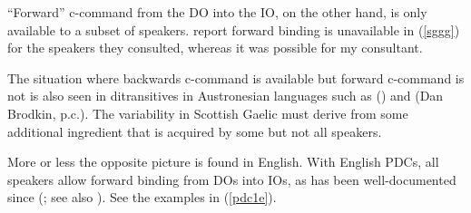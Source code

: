 \documentclass[output=paper,colorlinks,citecolor=brown]{langscibook}
\begin{document}


\noindent ``Forward'' c-command from the DO into the IO, on the other hand, is only available to a subset of speakers. \citet{gt:Jung:2012} report forward binding is unavailable in (\ref{sggg}) for the speakers they consulted, whereas it was possible for my consultant. 


\noindent The situation where backwards c-command is available but forward c-command is not is also seen in ditransitives in Austronesian languages such as  (\citealt{gt:Pearson:2000}) and  (Dan Brodkin, p.c.). The variability in Scottish Gaelic must derive from some additional ingredient that is acquired by some but not all speakers. 

More or less the opposite picture is found in English. With English PDCs, all speakers allow forward binding from DOs into IOs, as has been well-documented since \citeauthor{gt:Barss:1986a} (\citeyear{gt:Barss:1986a}; see also \citealt{gt:Larson:1988}). See the examples in (\ref{pdc1e}).

\end{document}
